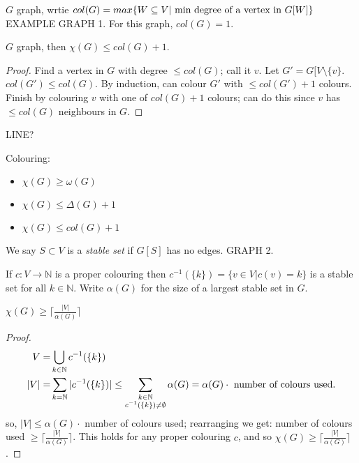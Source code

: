 \documentclass{article}
\begin{document}
\begin{defn}
$G$ graph, wrtie $col(G)=max\{W\subseteq V| \textmd{ min degree of a vertex in }G[W]\}$ EXAMPLE GRAPH 1. For this graph, $col(G)=1$.
\end{defn}

\begin{thm}
$G$ graph, then $\chi(G) \leq col(G)+1$.
\end{thm}

\begin{proof}
Find a vertex in $G$ with degree $\leq col(G)$; call it $v$.  Let $G' =G[V \setminus \{v\}$.  $col(G') \leq col(G)$.  By induction, can colour $G'$ with $\leq col(G') +1$ colours.  Finish by colouring $v$ with one of $col(G)+1$ colours; can do this since $v$ has $\leq col(G)$ neighbours in $G$.
\end{proof}

LINE?

 Colouring:
\begin{itemize}
 \item $\chi(G) \geq \omega(G)$
\item $\chi(G) \leq \Delta(G)+1$
\item $\chi(G) \leq col(G)+1$
\end{itemize}

\begin{defn}
We say $S \subset V$ is a \emph{stable set} if $G[S]$ has no edges.  GRAPH 2.
\end{defn}

\begin{rem}
If $c: V \rightarrow \mathbb{N}$ is a proper colouring then $c^{-1}(\{k\})=\{v \in V | c(v) = k\}$ is a stable set for all $k \in \mathbb{N}$.   Write $\alpha(G)$ for the size of a largest stable set in $G$.
\end{rem}

\begin{prop}
$\chi(G) \geq \lceil\frac{|V|}{\alpha(G)} \rceil$
\end{prop}

\begin{proof}
\begin{align*}
V =& \bigcup_{k \in \mathbb{N}} c^{-1}(\{k\}) \\
|V| = & \sum_{k=\mathbb{N}} |c^{-1}(\{k\})| \leq \sum_{\substack{k \in \mathbb{N} \\ c^{-1}(\{k\}) \neq \emptyset}} \alpha(G) = \alpha(G) \cdot \textmd{ number of colours used}.
\end{align*}
so, $|V| \leq \alpha(G) \cdot$ number of colours used; rearranging we get: number of colours used $\geq \lceil \frac{|V|}{\alpha(G)} \rceil$.  This holds for any proper colouring $c$, and so $\chi(G) \geq \lceil \frac{|V|}{\alpha(G)} \rceil$.
\end{proof}
\end{document}
